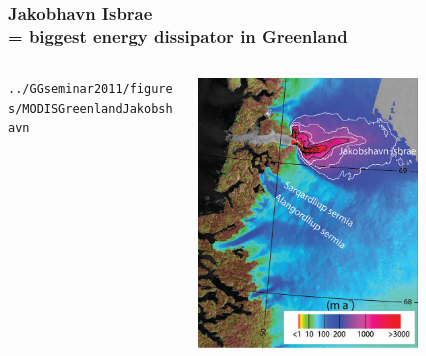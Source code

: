 \documentclass{beamer}
\begin{document}
\begin{frame}
  \frametitle{Jakobhavn Isbrae \\ = biggest energy dissipator in Greenland}

\begin{columns}
\begin{column}{0.3\textwidth}
\begin{center}
  \texttt{../GGseminar2011/figures/MODISGreenlandJakobshavn}
\end{center}
\end{column}
\begin{column}{0.7\textwidth}
\begin{center}
  \includegraphics[width=0.7\textwidth]{Joughin2010Fig6_half.png}  
\end{center}
\end{column}
\end{columns}
\end{frame}
\end{document}
